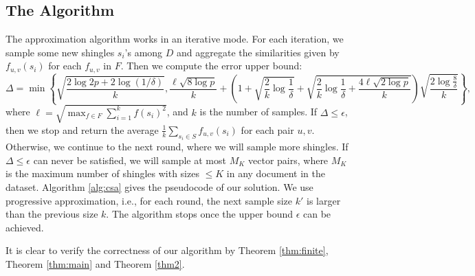 \documentclass{article}
\begin{document}
\subsection{The Algorithm}
The approximation algorithm works in an iterative mode. For each iteration, we sample some new shingles $s_i$'s among $D$ and aggregate the similarities given by $f_{u,v}(s_i)$ for each $f_{u,v}$ in $F$. Then we compute the error upper bound:
$$\Delta = \min\left\{\sqrt{\frac{2\log 2p + 2\log(1/\delta)}{k}}, \frac{\ell\sqrt{8\log p}}{k} +\left(1+\sqrt{\frac{2}{k}\log \frac{1}{\delta}} + \sqrt{\frac{2}{k}\log \frac{1}{\delta} + \frac{4\ell\sqrt{2\log p}}{k}}\right)\sqrt{\frac{2\log \frac{8}{\delta}}{k}}\right\},$$
where $\ell = \sqrt{\max_{f\in F} \sum_{i=1}^k f(s_i)^2}$, and $k$ is the number of samples. 
If $\Delta \leq \epsilon$, then we stop and return the average $\frac{1}{k}\sum_{s_i\in S}f_{u,v}(s_i)$ for each pair $u, v$. Otherwise, we continue to the next round, where we will sample more shingles. If $\Delta \leq \epsilon$ can never be satisfied, we will sample at most $M_K$ vector pairs, where $M_K$ is the maximum number of shingles with sizes $\leq K$ in any document in the dataset. Algorithm \ref{alg:csa} gives the pseudocode of our solution. We use progressive approximation, i.e., for each round, the next sample size $k'$ is larger than the previous size $k$. The algorithm stops once the upper bound $\epsilon$ can be achieved. 

It is clear to verify the correctness of our algorithm by Theorem \ref{thm:finite}, Theorem \ref{thm:main} and Theorem \ref{thm2}.
\end{document}
